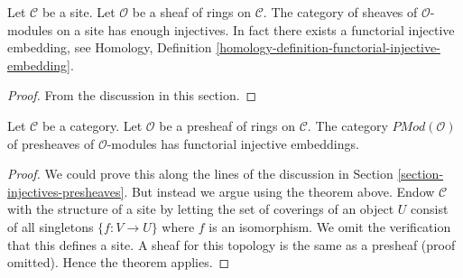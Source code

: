 \begin{theorem}
\label{theorem-sheaves-modules-injectives}
Let $\mathcal{C}$ be a site.
Let $\mathcal{O}$ be a sheaf of rings on $\mathcal{C}$.
The category of sheaves of $\mathcal{O}$-modules on a
site has enough injectives. In fact there exists
a functorial injective embedding, see
Homology, Definition \ref{homology-definition-functorial-injective-embedding}.
\end{theorem}

\begin{proof}
From the discussion in this section.
\end{proof}

\begin{proposition}
\label{proposition-presheaves-modules}
Let $\mathcal{C}$ be a category.
Let $\mathcal{O}$ be a presheaf of rings on $\mathcal{C}$.
The category $\textit{PMod}(\mathcal{O})$ of presheaves of
$\mathcal{O}$-modules has functorial injective embeddings.
\end{proposition}

\begin{proof}
We could prove this along the lines of the discussion in
Section \ref{section-injectives-presheaves}. But instead we argue using the
theorem above. Endow $\mathcal{C}$ with the structure of a site by letting the
set of coverings of an object $U$ consist of all singletons $\{f : V \to U\}$
where $f$ is an isomorphism. We omit the verification that this defines a site.
A sheaf for this topology is the same as a presheaf (proof omitted). Hence the
theorem applies.
\end{proof}








